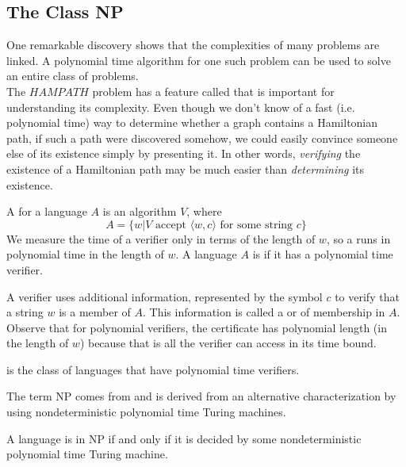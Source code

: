 \documentclass{article}
\begin{document}
\subsection{The Class NP}

One remarkable discovery shows that the complexities of many problems are linked. A polynomial time algorithm for one such problem can be used to solve an entire class of problems. \\ 

The $HAMPATH$ problem has a feature called  that is important for understanding its complexity. Even though we don't know of a fast (i.e. polynomial time) way to determine whether a graph contains a Hamiltonian path, if such a path were discovered somehow, we could easily convince someone else of its existence simply by presenting it. In other words, \emph{verifying} the existence of a Hamiltonian path may be much easier than \emph{determining} its existence. 

\begin{definition}[Verifier]
  A  for a language $A$ is an algorithm $V$, where $$A = \{w | V \textrm{ accept } \langle w,c \rangle \textrm{ for some string } c\}$$ We measure the time of a verifier only in terms of the length of $w$, so a  runs in polynomial time in the length of $w$. A language $A$ is  if it has a polynomial time verifier. 
\end{definition}

A verifier uses additional information, represented by the symbol $c$ to verify that a string $w$ is a member of $A$. This information is called a  or  of membership in $A$. Observe that for polynomial verifiers, the certificate has polynomial length (in the length of $w$) because that is all the verifier can access in its time bound.  

\begin{definition}
   is the class of languages that have polynomial time verifiers. 
\end{definition}

The term NP comes from  and is derived from an alternative characterization by using nondeterministic polynomial time Turing machines. 

\begin{theorem}
  A language is in NP if and only if it is decided by some nondeterministic polynomial time Turing machine. 
\end{theorem}
\end{document}

